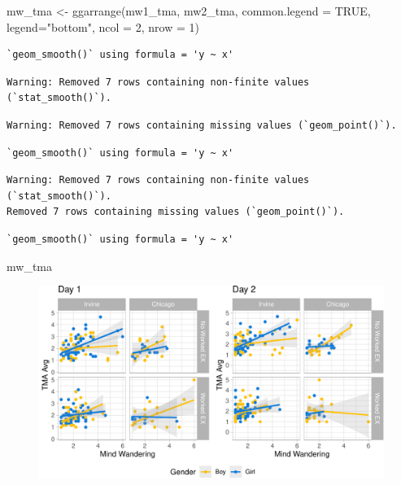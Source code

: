 \documentclass[
  letterpaper,
  DIV=11,
  numbers=noendperiod]{scrartcl}
\newenvironment{Shaded}{\begin{snugshade}}{\end{snugshade}}
\newcommand{\AttributeTok}[1]{\textcolor[rgb]{0.49,0.56,0.16}{#1}}
\newcommand{\ConstantTok}[1]{\textcolor[rgb]{0.53,0.00,0.00}{#1}}
\newcommand{\DecValTok}[1]{\textcolor[rgb]{0.25,0.63,0.44}{#1}}
\newcommand{\FunctionTok}[1]{\textcolor[rgb]{0.02,0.16,0.49}{#1}}
\newcommand{\NormalTok}[1]{\textcolor[rgb]{0.00,0.44,0.13}{#1}}
\newcommand{\OtherTok}[1]{\textcolor[rgb]{0.00,0.44,0.13}{#1}}
\newcommand{\StringTok}[1]{\textcolor[rgb]{0.25,0.44,0.63}{#1}}
\begin{document}
\begin{Shaded}
\begin{Highlighting}[]
\NormalTok{mw\_tma }\OtherTok{\textless{}{-}} \FunctionTok{ggarrange}\NormalTok{(mw1\_tma, mw2\_tma, }
          \AttributeTok{common.legend =} \ConstantTok{TRUE}\NormalTok{, }\AttributeTok{legend=}\StringTok{"bottom"}\NormalTok{, }\AttributeTok{ncol =} \DecValTok{2}\NormalTok{, }\AttributeTok{nrow =} \DecValTok{1}\NormalTok{)}
\end{Highlighting}
\end{Shaded}

\begin{verbatim}
`geom_smooth()` using formula = 'y ~ x'
\end{verbatim}

\begin{verbatim}
Warning: Removed 7 rows containing non-finite values (`stat_smooth()`).
\end{verbatim}

\begin{verbatim}
Warning: Removed 7 rows containing missing values (`geom_point()`).
\end{verbatim}

\begin{verbatim}
`geom_smooth()` using formula = 'y ~ x'
\end{verbatim}

\begin{verbatim}
Warning: Removed 7 rows containing non-finite values (`stat_smooth()`).
Removed 7 rows containing missing values (`geom_point()`).
\end{verbatim}

\begin{verbatim}
`geom_smooth()` using formula = 'y ~ x'
\end{verbatim}

\begin{Shaded}
\begin{Highlighting}[]
\NormalTok{mw\_tma}
\end{Highlighting}
\end{Shaded}

\begin{figure}[H]

{\centering \includegraphics{sampling_files/figure-pdf/unnamed-chunk-22-1.pdf}

}

\end{figure}
\end{document}
